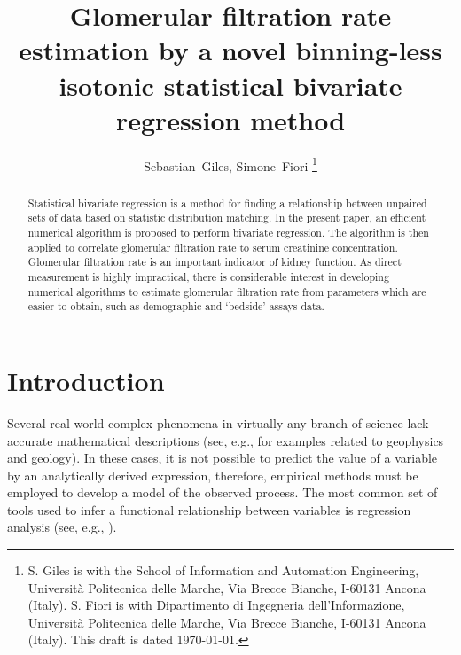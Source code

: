 \documentclass[10pt,final]{siamltex}
\begin{document}
\title{Glomerular filtration rate estimation by a novel binning-less isotonic statistical bivariate regression method}
\author{Sebastian~Giles, Simone~Fiori%
\thanks{S. Giles is with the School of Information and Automation Engineering,
Universit\`{a} Politecnica delle Marche,
Via Brecce Bianche, I-60131 Ancona (Italy).
\newline\indent
S. Fiori is with Dipartimento di Ingegneria dell'Informazione,
Universit\`{a} Politecnica delle Marche,
Via Brecce Bianche, I-60131 Ancona (Italy).
\newline\indent
This draft is dated \today.}}
\maketitle
\def\bbbr{\mathbb{R}}
\def\bbbx{\mathbb{X}}
\def\bbby{\mathbb{Y}}
\def\mdef{{\stackrel{{\mathrm{def}}}{=}}}
\renewcommand*{\thefootnote}{\fnsymbol{footnote}}
\def\to{\mathbf{\ to\ }}
\setcounter{footnote}{1}
%
%
\begin{abstract}
Statistical bivariate regression is a method for finding a relationship between unpaired sets of data based on statistic distribution matching. In the present paper, an efficient numerical algorithm is proposed to perform bivariate regression. The algorithm is then applied to correlate glomerular filtration rate to serum creatinine concentration. Glomerular filtration rate is an important indicator of kidney function. As direct measurement is highly impractical, there is considerable interest in developing numerical algorithms to estimate glomerular filtration rate from parameters which are easier to obtain, such as demographic and `bedside' assays data.
\end{abstract}
%
\section{Introduction}\label{intro}
Several real-world complex phenomena in virtually any branch of science lack accurate mathematical descriptions (see, e.g., \cite{seismic,strontium} for examples related to geophysics and geology). In these cases, it is not possible to predict the value of a variable by an analytically derived expression, therefore, empirical methods must be employed to develop a model of the observed process. The most common set of tools used to infer a functional relationship between variables is regression analysis (see, e.g., \cite{control, ts}).

\end{document}
